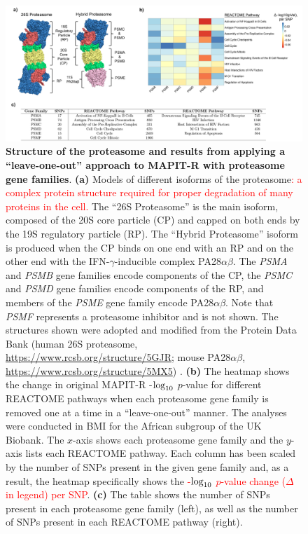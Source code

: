 \documentclass[10pt]{article}
\def\log{{\rm log}}
\begin{document}
\begin{landscape}
\begin{figure}[htbp]
\centering
\includegraphics[scale=.6]{Images/Main/Figure5.png}
\caption{\textbf{Structure of the proteasome and results from applying a ``leave-one-out'' approach to MAPIT-R with proteasome gene families}. \textbf{(a)} Models of different isoforms of the proteasome\textcolor{red}{: a complex protein structure required for proper degradation of many proteins in the cell.} The ``26S Proteasome'' is the main isoform, composed of the 20S core particle (CP) and capped on both ends by the 19S regulatory particle (RP). The ``Hybrid Proteasome'' isoform is produced when the CP binds on one end with an RP and on the other end with the IFN-$\gamma$-inducible complex PA28$\alpha\beta$. The \textit{PSMA} and \textit{PSMB} gene families encode components of the CP, the \textit{PSMC} and \textit{PSMD} gene families encode components of the RP, and members of the \textit{PSME} gene family encode PA28$\alpha\beta$. Note that \textit{PSMF} represents a proteasome inhibitor and is not shown. The structures shown were adopted and modified from the Protein Data Bank (human 26S proteasome, \url{https://www.rcsb.org/structure/5GJR}; mouse PA28$\alpha\beta$, \url{https://www.rcsb.org/structure/5MX5}) \cite{Murata2018}. \textbf{(b)} The heatmap shows the change in original MAPIT-R -$\log_{10}$ $p$-value for different REACTOME pathways when each proteasome gene family is removed one at a time in a ``leave-one-out'' manner. The analyses were conducted in BMI for the African subgroup of the UK Biobank. The $x$-axis shows each proteasome gene family and the $y$-axis lists each REACTOME pathway. Each column has been scaled by the number of SNPs present in the given gene family and, as a result, the heatmap specifically shows the \textcolor{red}{-$\log_{10}$ $p$-value change ($\Delta$ in legend) per SNP}. \textbf{(c)} The table shows the number of SNPs present in each proteasome gene family (left), as well as the number of SNPs present in each REACTOME pathway (right).}
\label{MAPITR-Main-Figure-Proteasome-Panels}
\end{figure} 
\end{landscape}


\begingroup
{}

\endgroup
\end{document}
